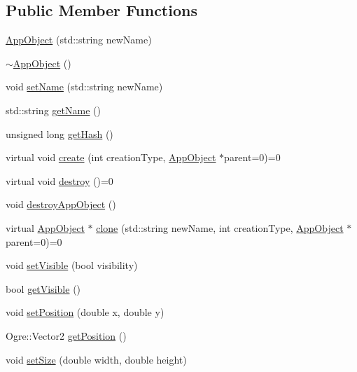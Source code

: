 \subsection*{Public Member Functions}
\begin{DoxyCompactItemize}
\item 
\hyperlink{class_rad_xml_1_1_app_object_a1d240a24759f87ba7185e41cf6ce5203}{App\-Object} (std\-::string new\-Name)
\item 
\hyperlink{class_rad_xml_1_1_app_object_a2d1d03691180677bb4e2d1ca5a4e5fe9}{$\sim$\-App\-Object} ()
\item 
void \hyperlink{class_rad_xml_1_1_app_object_ad93dc5cc45147641e2c11b5f29e543fe}{set\-Name} (std\-::string new\-Name)
\item 
std\-::string \hyperlink{class_rad_xml_1_1_app_object_a314ea75b9f6990969da0a1ad52704359}{get\-Name} ()
\item 
unsigned long \hyperlink{class_rad_xml_1_1_app_object_ae31c46cd42db05b091fc21ee3e3e9988}{get\-Hash} ()
\item 
virtual void \hyperlink{class_rad_xml_1_1_app_object_a1b3a64526ef9b8b1dccb42c229e57c9b}{create} (int creation\-Type, \hyperlink{class_rad_xml_1_1_app_object}{App\-Object} $\ast$parent=0)=0
\item 
virtual void \hyperlink{class_rad_xml_1_1_app_object_af5d0344ed184df141f0a7c499caa9e55}{destroy} ()=0
\item 
void \hyperlink{class_rad_xml_1_1_app_object_addc61055d1f7afb716e1bd8e8fefff74}{destroy\-App\-Object} ()
\item 
virtual \hyperlink{class_rad_xml_1_1_app_object}{App\-Object} $\ast$ \hyperlink{class_rad_xml_1_1_app_object_a201b592dded2aa775cb182672d331d51}{clone} (std\-::string new\-Name, int creation\-Type, \hyperlink{class_rad_xml_1_1_app_object}{App\-Object} $\ast$parent=0)=0
\item 
void \hyperlink{class_rad_xml_1_1_app_object_ada67fca43a72291be9dbe6e9088055a8}{set\-Visible} (bool visibility)
\item 
bool \hyperlink{class_rad_xml_1_1_app_object_a8521dea96a2daec23bbe069efc6a28d9}{get\-Visible} ()
\item 
void \hyperlink{class_rad_xml_1_1_app_object_af7c0778e32d0e9b931b8410e33fc6028}{set\-Position} (double x, double y)
\item 
Ogre\-::\-Vector2 \hyperlink{class_rad_xml_1_1_app_object_abd667e70cdff066891a13f97f27750dd}{get\-Position} ()
\item 
void \hyperlink{class_rad_xml_1_1_app_object_a4a4e8a18fe7cd99c0d2046ac039034c6}{set\-Size} (double width, double height)

\end{DoxyCompactItemize}
